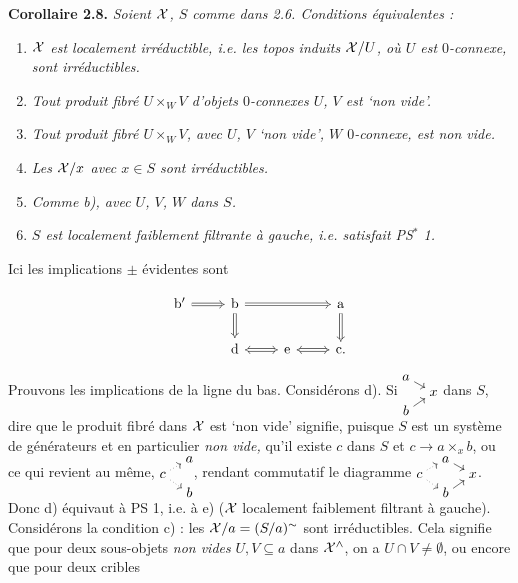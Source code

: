 \noindent\textbf{Corollaire 2.8.} \textit{Soient $\mathcal{X}$, $S$ comme dans 2.6. Conditions équivalentes :}
\begin{enumerate}[label={},leftmargin=3em]
\item[\textit{a)}] \textit{$\mathcal{X}$ est localement irréductible, i.e. les topos induits $\mathcal{X}/U$, où $U$ est $0$-connexe, sont irréductibles.}
\item[\textit{b)}] \textit{Tout produit fibré $U \times_W V$ d'objets $0$-connexes $U$, $V$ est `non vide'.}
\item[\textit{b$'$)}] \textit{Tout produit fibré $U \times_W V$, avec $U$, $V$ `non vide', $W$ $0$-connexe, est non vide.}
\item[\textit{c)}] \textit{Les $\mathcal{X}/x$ avec $x \in S$ sont irréductibles.}
\item[\textit{d)}] \textit{Comme b), avec $U$, $V$, $W$ dans $S$.}
\item[\textit{e)}] \textit{$S$ est localement faiblement filtrante à gauche, i.e. satisfait PS$^*$ 1.}
\end{enumerate}
\noindent Ici les implications $\pm$ évidentes sont


\[
\begin{tikzcd}
\mathrm{b}' \arrow[r, Rightarrow] & \mathrm{b} \arrow[rr, Rightarrow] \arrow[d, Rightarrow] & & \mathrm{a} \arrow[d, Rightarrow] \\
 & \mathrm{d} \arrow[r, Leftrightarrow] & \mathrm{e} \arrow[r, Leftrightarrow] & \mathrm{c}.
\end{tikzcd}
\]

Prouvons les implications de la ligne du bas. Considérons d). Si $\begin{tikzcd}[cramped, row sep=0.1em, column sep=0.8em, baseline=(current bounding box.center)] a \arrow[dr] & \\ & x \\ b \arrow[ur] & \end{tikzcd}$ dans $S$, dire que le produit fibré dans $\mathcal{X}$ est `non vide' signifie, puisque $S$ est un système de générateurs et en particulier \textit{non vide,} qu'il existe $c$ dans $S$ et $c\longrightarrow a\times_x b$, ou ce qui revient au même, $\begin{tikzcd}[cramped, row sep=0.1em, column sep=0.8em, baseline=(current bounding box.center)] & a \\ c \arrow[ur, dotted] \arrow[dr, dotted] & \\ & b \end{tikzcd}$, rendant commutatif le diagramme $\begin{tikzcd}[cramped, row sep=0.1em, column sep=0.8em, baseline=(current bounding box.center)] & a \arrow[dr] & \\ c \arrow[ur, dotted] \arrow[dr, dotted] & & x \\ & b \arrow[ur] & \end{tikzcd}$. Donc d) équivaut à PS 1, i.e. à e) ($\mathcal{X}$ localement faiblement filtrant à gauche). Considérons la condition c) : les $\mathcal{X}/a=(S/a)^\sim$ sont irréductibles. Cela signifie que pour deux sous-objets \textit{non vides} $U,V\subseteq a$ dans $\mathcal{X}^\wedge$, on a $U\cap V\neq\emptyset$, ou encore que pour deux cribles

